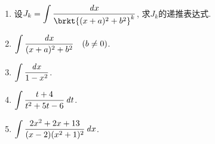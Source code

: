 \documentclass[a4paper,punct=CCT]{ctexbook}
\theoremstyle{break}
\newif\ifshowsol
\begin{document}
\begin{enumerate}
  \ifshowsol
  \setlength{\itemsep}{10pt plus 4pt minus 4pt}
  \setlength{\abovedisplayskip}{5pt plus 2pt minus 5pt}
  \setlength{\belowdisplayskip}{10pt plus 3pt minus 2pt}
  \fi
\item 设\(\displaystyle J_k = \int \frac{\dx}{\brkt{(x+a)^2 + b^2}^k}\), 求\(J_k\)的递推表达式.

  \ifshowsol
  因为
  \[
    J_k
    = \int \frac{\dx}{\brkt{(x+a)^2 + b^2}^k}
    = \int \frac{\diff(x+a)}{\brkt{(x+a)^2 + b^2}^k}
    = \int \frac{\du}{\paren{u^2 + b^2}^k}
    = I_{k,b^2}(u)
    = I_{k,b^2}(x+a),
  \]
  所以
  \begin{equation*}
    \begin{split}
      J_{k+1}
      = I_{k+1,b^2}(x+a)
      &= \frac{1}{2kb^2} \brce[\bigg]{(2k-1) I_{k,b^2}(x+a) + \frac{x+a}{\brkt{(x+a)^2 + b^2}^k}} \\
      &= \frac{1}{2kb^2} \brce[\bigg]{(2k-1) J_k + \frac{x+a}{\brkt{(x+a)^2 + b^2}^k}}.
    \end{split}
  \end{equation*}
  \fi

\item \(\displaystyle \int \frac{\mathop{}\!\mathit{d} x}{(x+a)^2 + b^2} \quad (b \ne 0)\).

  \ifshowsol
  \[
    \int \frac{\dx}{(x+a)^2 + b^2}
    = \int \frac{\diff(x+a)}{(x+a)^2 + b^2}
    = \int \frac{\du}{u^2 + b^2}
    = \frac1b \arctan \frac ub + C
    = \frac1b \arctan \frac{x+a}b + C.
  \]
  \fi

\item \(\displaystyle \int \frac{\mathop{}\!\mathit{d} x}{1-x^2}\).

  \ifshowsol
  \[
    \int \frac{\dx}{1-x^2}
    = \arctanh x + C
    = \frac12 \ln\frac{1+x}{1-x} + C.
  \]
  \fi

\item \(\displaystyle \int \frac{t+4}{t^2 + 5t -6} \mathop{}\!\mathit{d} t\).

  \ifshowsol
  \[
    \begin{split}
      \int \frac{t+4}{t^2 + 5t -6} \dt
      &= \int \frac{t+4}{(t-1)(t+6)} \dt
      = \frac57 \int \frac{\dt}{t-1} + \frac27 \int \frac{\dt}{t+6} \\
      &= \frac57 \ln\abs[\big]{t-1} + \frac27 \ln\abs[\big]{t+6} + C
      = \frac17 \ln\abs[\big]{(t-1)^5 (t+6)^2} + C.
    \end{split}
  \]
  \fi

\item \(\displaystyle \int \frac{2x^2+2x+13}{(x-2)(x^2+1)^2} \mathop{}\!\mathit{d} x\).


\end{enumerate}
\end{document}
